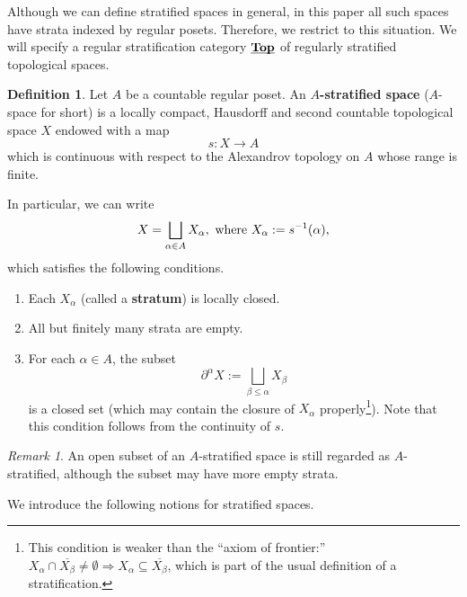 \documentclass[reqno, 10pt]{amsart}
\numberwithin{equation}{section}
\numberwithin{equation}{section}
\renewcommand{\subset}{\subseteq}
\theoremstyle{definition}
\newtheorem{defn}[thm]{Definition}
\theoremstyle{remark}
\newtheorem{rem}[thm]{Remark}
\newcommand{\beqn}{\begin{equation*}}
\newcommand{\eeqn}{\end{equation*}}
\newcommand{\ov}{\overline}
\newcommand{\uds}[1]{\underline{\smash{#1}}}
\begin{document}
Although we can define stratified spaces in general, in this paper all such spaces have strata indexed by regular posets. Therefore, we restrict to this situation. We will specify a regular stratification category $\uds{\bf Top}$ of regularly stratified topological spaces.

\begin{defn}\label{defn_stratified}
Let $A$ be a countable regular poset. An \textbf{$A$-stratified space} ($A$-space for short) is a locally compact, Hausdorff and second countable topological space $X$ endowed with a map
\beqn
s: X \to A
\eeqn
which is continuous with respect to the Alexandrov topology on $A$ whose range is finite. 
\end{defn}

In particular, we can write
\beqn
X = \bigsqcup_{\alpha \in A} X_\alpha,\ {\rm where}\ X_\alpha:= s^{-1}(\alpha),
\eeqn
which satisfies the following conditions. 
\begin{enumerate}
    \item Each $X_\alpha$ (called a {\bf stratum}) is locally closed.
    
    \item All but finitely many strata are empty.
    
    \item For each $\alpha\in A$, the subset
    \beqn
    \partial^\alpha X:= \bigsqcup_{\beta \leq \alpha} X_\beta
    \eeqn
    is a closed set (which may contain the closure of $X_\alpha$ properly\footnote{This condition is weaker than the ``axiom of frontier:'' $X_\alpha \cap \ov{X_\beta} \neq \emptyset \Longrightarrow X_\alpha \subset \ov{X_\beta}$, which is part of the usual definition of a stratification.}). Note that this condition follows from the continuity of $s$.
\end{enumerate}

\begin{rem}
An open subset of an $A$-stratified space is still regarded as $A$-stratified, although the subset may have more empty strata.
\end{rem}






We introduce the following notions for stratified spaces.
\end{document}
